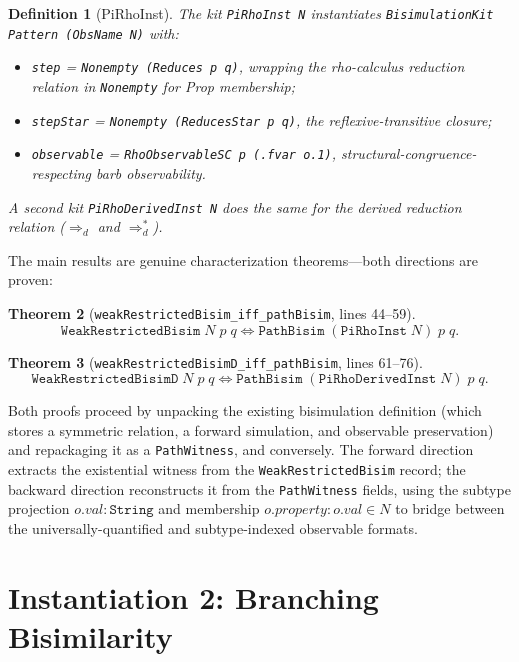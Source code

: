 \documentclass[11pt]{article}
\newtheorem{theorem}{Theorem}[section]
\newtheorem{definition}[theorem]{Definition}
\begin{document}
\begin{definition}[PiRhoInst]
The kit \texttt{PiRhoInst N} instantiates \texttt{BisimulationKit Pattern (ObsName N)} with:
\begin{itemize}
\item \texttt{step} = \texttt{Nonempty (Reduces p q)}, wrapping the
  rho-calculus reduction relation in \texttt{Nonempty} for Prop membership;
\item \texttt{stepStar} = \texttt{Nonempty (ReducesStar p q)}, the
  reflexive-transitive closure;
\item \texttt{observable} = \texttt{RhoObservableSC p (.fvar o.1)},
  structural-congruence-respecting barb observability.
\end{itemize}
A second kit \texttt{PiRhoDerivedInst N} does the same for the derived
reduction relation ($\Rightarrow_d$ and $\Rightarrow_d^*$).
\end{definition}

The main results are genuine characterization theorems---both directions
are proven:

\begin{theorem}[\texttt{weakRestrictedBisim\_iff\_pathBisim}, lines 44--59]\label{thm:weak-pirho}
\[
  \texttt{WeakRestrictedBisim}\;N\;p\;q \iff
  \texttt{PathBisim}\;(\texttt{PiRhoInst}\;N)\;p\;q.
\]
\end{theorem}

\begin{theorem}[\texttt{weakRestrictedBisimD\_iff\_pathBisim}, lines 61--76]\label{thm:weakD-pirho}
\[
  \texttt{WeakRestrictedBisimD}\;N\;p\;q \iff
  \texttt{PathBisim}\;(\texttt{PiRhoDerivedInst}\;N)\;p\;q.
\]
\end{theorem}

Both proofs proceed by unpacking the existing bisimulation definition
(which stores a symmetric relation, a forward simulation, and observable
preservation) and repackaging it as a \texttt{PathWitness}, and
conversely.  The forward direction extracts the existential witness from
the \texttt{WeakRestrictedBisim} record; the backward direction
reconstructs it from the \texttt{PathWitness} fields, using the subtype
projection $o.\mathit{val} : \texttt{String}$ and membership
$o.\mathit{property} : o.\mathit{val} \in N$ to bridge between the
universally-quantified and subtype-indexed observable formats.


\section{Instantiation 2: Branching Bisimilarity}\label{sec:branching}
\end{document}
